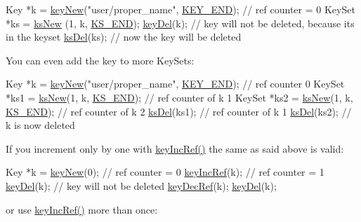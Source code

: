 \begin{DoxyCodeInclude}
Key *k = \hyperlink{group__key_gad23c65b44bf48d773759e1f9a4d43b89}{keyNew}(\textcolor{stringliteral}{"user/proper\_name"}, \hyperlink{group__key_gga91fb3178848bd682000958089abbaf40aa8adb6fcb92dec58fb19410eacfdd403}{KEY\_END}); \textcolor{comment}{// ref counter = 0}
KeySet *ks = \hyperlink{group__keyset_ga671e1aaee3ae9dc13b4834a4ddbd2c3c}{ksNew} (1, k, \hyperlink{kdbenum_8c_a7a28fce3773b2c873c94ac80b8b4cd54}{KS\_END});
\hyperlink{group__key_ga3df95bbc2494e3e6703ece5639be5bb1}{keyDel}(k); \textcolor{comment}{// key will not be deleted, because its in the keyset}
\hyperlink{group__keyset_ga27e5c16473b02a422238c8d970db7ac8}{ksDel}(ks); \textcolor{comment}{// now the key will be deleted}
\end{DoxyCodeInclude}
 You can even add the key to more Key\+Sets\+:


\begin{DoxyCodeInclude}
Key *k = \hyperlink{group__key_gad23c65b44bf48d773759e1f9a4d43b89}{keyNew}(\textcolor{stringliteral}{"user/proper\_name"}, \hyperlink{group__key_gga91fb3178848bd682000958089abbaf40aa8adb6fcb92dec58fb19410eacfdd403}{KEY\_END}); \textcolor{comment}{// ref counter 0}
KeySet *ks1 = \hyperlink{group__keyset_ga671e1aaee3ae9dc13b4834a4ddbd2c3c}{ksNew}(1, k, \hyperlink{kdbenum_8c_a7a28fce3773b2c873c94ac80b8b4cd54}{KS\_END}); \textcolor{comment}{// ref counter of k 1}
KeySet *ks2 = \hyperlink{group__keyset_ga671e1aaee3ae9dc13b4834a4ddbd2c3c}{ksNew}(1, k, \hyperlink{kdbenum_8c_a7a28fce3773b2c873c94ac80b8b4cd54}{KS\_END}); \textcolor{comment}{// ref counter of k 2}
\hyperlink{group__keyset_ga27e5c16473b02a422238c8d970db7ac8}{ksDel}(ks1); \textcolor{comment}{// ref counter of k 1}
\hyperlink{group__keyset_ga27e5c16473b02a422238c8d970db7ac8}{ksDel}(ks2); \textcolor{comment}{// k is now deleted}
\end{DoxyCodeInclude}
 If you increment only by one with \hyperlink{group__key_ga6970a6f254d67af7e39f8e469bb162f1}{key\+Inc\+Ref()} the same as said above is valid\+:


\begin{DoxyCodeInclude}
Key *k = \hyperlink{group__key_gad23c65b44bf48d773759e1f9a4d43b89}{keyNew}(0); \textcolor{comment}{// ref counter = 0}
\hyperlink{group__key_ga6970a6f254d67af7e39f8e469bb162f1}{keyIncRef}(k); \textcolor{comment}{// ref counter = 1}
\hyperlink{group__key_ga3df95bbc2494e3e6703ece5639be5bb1}{keyDel}(k); \textcolor{comment}{// key will not be deleted}
\hyperlink{group__key_ga2c6433ca22109e4e141946057eccb283}{keyDecRef}(k);
\hyperlink{group__key_ga3df95bbc2494e3e6703ece5639be5bb1}{keyDel}(k);
\end{DoxyCodeInclude}
 or use \hyperlink{group__key_ga6970a6f254d67af7e39f8e469bb162f1}{key\+Inc\+Ref()} more than once\+:


